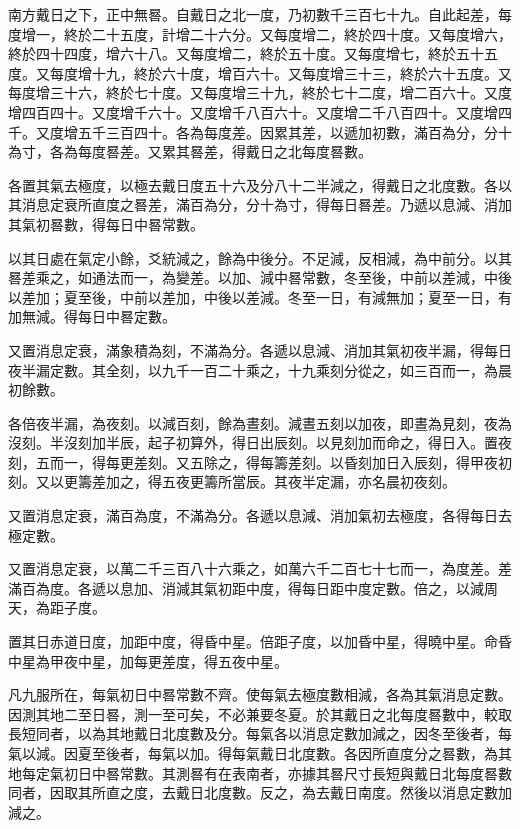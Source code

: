 \begin{pinyinscope}
 南方戴日之下，正中無晷。自戴日之北一度，乃初數千三百七十九。自此起差，每度增一，終於二十五度，計增二十六分。又每度增二，終於四十度。又每度增六，終於四十四度，增六十八。又每度增二，終於五十度。又每度增七，終於五十五度。又每度增十九，終於六十度，增百六十。又每度增三十三，終於六十五度。又每度增三十六，終於七十度。又每度增三十九，終於七十二度，增二百六十。又度增四百四十。又度增千六十。又度增千八百六十。又度增二千八百四十。又度增四千。又度增五千三百四十。各為每度差。因累其差，以遞加初數，滿百為分，分十為寸，各為每度晷差。又累其晷差，得戴日之北每度晷數。



 各置其氣去極度，以極去戴日度五十六及分八十二半減之，得戴日之北度數。各以其消息定衰所直度之晷差，滿百為分，分十為寸，得每日晷差。乃遞以息減、消加其氣初晷數，得每日中晷常數。



 以其日處在氣定小餘，爻統減之，餘為中後分。不足減，反相減，為中前分。以其晷差乘之，如通法而一，為變差。以加、減中晷常數，冬至後，中前以差減，中後以差加；夏至後，中前以差加，中後以差減。冬至一日，有減無加；夏至一日，有加無減。得每日中晷定數。



 又置消息定衰，滿象積為刻，不滿為分。各遞以息減、消加其氣初夜半漏，得每日夜半漏定數。其全刻，以九千一百二十乘之，十九乘刻分從之，如三百而一，為晨初餘數。



 各倍夜半漏，為夜刻。以減百刻，餘為晝刻。減晝五刻以加夜，即晝為見刻，夜為沒刻。半沒刻加半辰，起子初算外，得日出辰刻。以見刻加而命之，得日入。置夜刻，五而一，得每更差刻。又五除之，得每籌差刻。以昏刻加日入辰刻，得甲夜初刻。又以更籌差加之，得五夜更籌所當辰。其夜半定漏，亦名晨初夜刻。



 又置消息定衰，滿百為度，不滿為分。各遞以息減、消加氣初去極度，各得每日去極定數。



 又置消息定衰，以萬二千三百八十六乘之，如萬六千二百七十七而一，為度差。差滿百為度。各遞以息加、消減其氣初距中度，得每日距中度定數。倍之，以減周天，為距子度。



 置其日赤道日度，加距中度，得昏中星。倍距子度，以加昏中星，得曉中星。命昏中星為甲夜中星，加每更差度，得五夜中星。



 凡九服所在，每氣初日中晷常數不齊。使每氣去極度數相減，各為其氣消息定數。因測其地二至日晷，測一至可矣，不必兼要冬夏。於其戴日之北每度晷數中，較取長短同者，以為其地戴日北度數及分。每氣各以消息定數加減之，因冬至後者，每氣以減。因夏至後者，每氣以加。得每氣戴日北度數。各因所直度分之晷數，為其地每定氣初日中晷常數。其測晷有在表南者，亦據其晷尺寸長短與戴日北每度晷數同者，因取其所直之度，去戴日北度數。反之，為去戴日南度。然後以消息定數加減之。




\end{pinyinscope}
